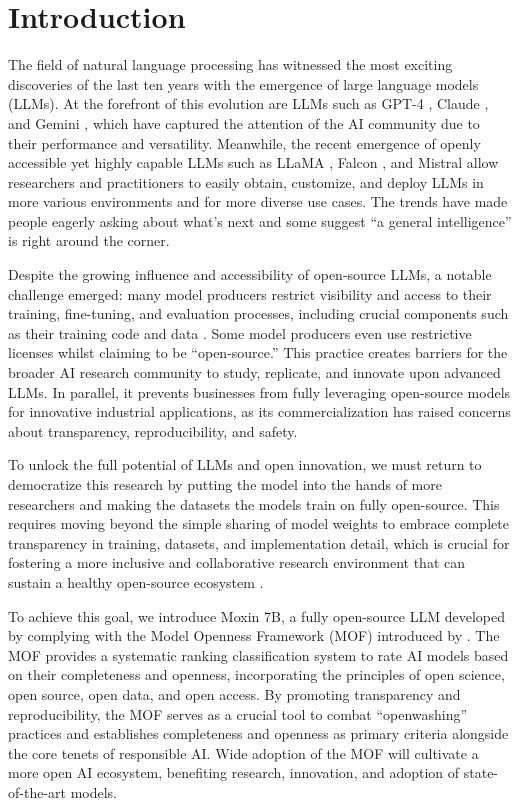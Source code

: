 \section{Introduction}\label{sec1.intro}




The field of natural language processing has witnessed the most exciting discoveries of the last ten years with the emergence of large language models (LLMs). At the forefront of this evolution are LLMs such as GPT-4 \cite{achiam2023gpt}, Claude \cite{Anthropic2023Claude3}, and Gemini \cite{team2023gemini}, which have captured the attention of the AI community due to their performance and versatility. Meanwhile, the recent emergence of openly accessible yet highly capable LLMs such as LLaMA  \cite{dubey2024llama}, Falcon \cite{prest2020falcon}, and Mistral \cite{jiang2023mistral7b} allow researchers and practitioners to easily obtain, customize, and deploy LLMs in more various environments and for more diverse use cases. The trends have made people eagerly asking about what's next and some suggest ``a general intelligence'' is right around the corner. 


Despite the growing influence and accessibility of open-source LLMs, a notable challenge emerged: many model producers restrict visibility and access to their training, fine-tuning, and evaluation processes, including crucial components such as their training code and data \cite{bommasani2023foundation}. Some model producers even use restrictive licenses whilst claiming to be ``open-source.'' This practice creates barriers for the broader AI research community to study, replicate, and innovate upon advanced LLMs. In parallel, it prevents businesses from fully leveraging open-source models for innovative industrial applications, as its commercialization has raised concerns about transparency, reproducibility, and safety. 

To unlock the full potential of LLMs and open innovation, we must return to democratize this research by putting the model into the hands of more researchers and making the datasets the models train on fully open-source. This requires moving beyond the simple sharing of model weights to embrace complete transparency in training, datasets, and implementation detail, which is crucial for fostering a more inclusive and collaborative research environment that can sustain a healthy open-source ecosystem \cite{kapoor2024societal}.

To achieve this goal, we introduce Moxin 7B, a fully open-source LLM developed by complying with the Model Openness Framework (MOF) introduced by \cite{white2024model}. The MOF provides a systematic ranking classification system to rate AI models based on their completeness and openness, incorporating the principles of open science, open source, open data, and open access. By promoting transparency and reproducibility, the MOF serves as a crucial tool to combat ``openwashing'' practices and establishes completeness and openness as primary criteria alongside the core tenets of responsible AI. Wide adoption of the MOF will cultivate a more open AI ecosystem, benefiting research, innovation, and adoption of state-of-the-art models.

